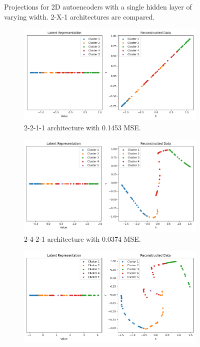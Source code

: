 \begin{figure}[htb]
  \caption{Projections for 2D autoencoders with a single hidden layer of varying width. 2-X-1 architectures are compared.}
  \label{fig:2-X-1}
\end{figure}

\begin{figure}[htb]
  \centering
  \begin{subfigure}[b]{0.49\textwidth}
    \centering
    \includegraphics[width=\linewidth]{images/RQ1/2-2-1-1_0.1453.png}
    \caption{2-2-1-1 architecture with \textcolor{red!80!black}{0.1453} MSE.}
    \label{fig:2-2-1-1-2}
  \end{subfigure}
  \hfill
  \begin{subfigure}[b]{0.49\textwidth}
    \centering
    \includegraphics[width=\linewidth]{images/RQ1/2-4-2-1_0.0374.png}
    \caption{2-4-2-1 architecture with \textcolor{red!20!black}{0.0374} MSE.}
    \label{fig:2-4-2-1}
  \end{subfigure}
  \hfill
  \begin{subfigure}[b]{0.49\textwidth}
    \centering
    \includegraphics[width=\linewidth]{images/RQ1/2-8-4-1_0.0094.png}

\end{subfigure}
\end{figure}

